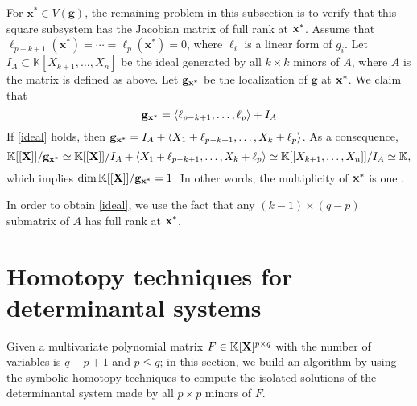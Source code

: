 \documentclass[11pt]{article}
\numberwithin{Property}{section}
\numberwithin{Theorem}{section}
\numberwithin{Proposition}{section}
\numberwithin{Lemma}{section}
\numberwithin{Corollary}{section}
\numberwithin{Definition}{section}
\numberwithin{Remark}{section}
\numberwithin{Conjecture}{section}
\numberwithin{Problem}{section}
\numberwithin{Claim}{section}
\theoremstyle{definition}
\numberwithin{Example}{section}
\def\g {\ensuremath{\mathbf{g}}}
\renewcommand{\leq}{\leqslant}
\newcommand{\field}{\mathbb{K}} %
\newcommand{\mat}[1]{\mathbf{\MakeUppercase{#1}}} %
\newcommand{\todo}[1]{\textcolor{red}{#1}} %
\begin{document}
For $\mathbf{x}^* \in V(\g)$, the remaining problem in this subsection is to verify that this square subsystem has the Jacobian matrix of full rank at ${\bf x}^*$. Assume that $\ell_{p-k+1}(\mathbf{x}^*) = \cdots =\ell_p(\mathbf{x}^*) = 0$, where $\ell_i$ is a linear form of $g_i$. Let $I_A \subset \field[X_{k+1}, \ldots, X_n]$ be the ideal generated by all $k \times k$ minors of $A$, where $A$ is the matrix is defined as above. Let $\g_{{\bf x}^*}$ be the localization of $\g$ at ${\bf x}^*$. We claim that 
\begin{equation}\label{ideal}
\g_{{\bf x}^*} = \langle \ell_{p-k+1}, \ldots, \ell_{p} \rangle + I_A
\end{equation}
If \cref{ideal} holds, then $\g_{{\bf x}^*} = I_A + \langle X_1+\ell_{p-k+1}, \ldots, X_k+\ell_{p} \rangle$. As a consequence, 
\[
\field[[\mat{X}]]/\g_{{\bf x}^*} \simeq \field[[\mat{X}]]/I_A + \langle X_1+\ell_{p-k+1}, \ldots, X_k+\ell_{p} \rangle  \simeq \field[[X_{k+1}, \ldots, X_n]]/I_A \simeq \field,
\] which implies $\dim \field[[\mat{X}]]/\g_{{\bf x}^*} = 1$. In other words, the multiplicity of ${\bf x}^*$ is one \cite[Appendix~A]{DJHPS}. 

In order to obtain \cref{ideal}, we use the fact that any $(k-1) \times (q-p)$ submatrix of $A$ has full rank at ${\bf x}^*$. %

\section{Homotopy techniques for determinantal systems} 
\label{sec:Algorithms}
Given a multivariate polynomial matrix $F \in \field[\mat{X}]^{p \times q}$ with the number of variables is $q-p+1$ and $p \leq q$; in this section, we build an algorithm by using the symbolic homotopy techniques to compute the isolated solutions of the determinantal system made by all $p \times p$ minors of $F$. 
\end{document}
